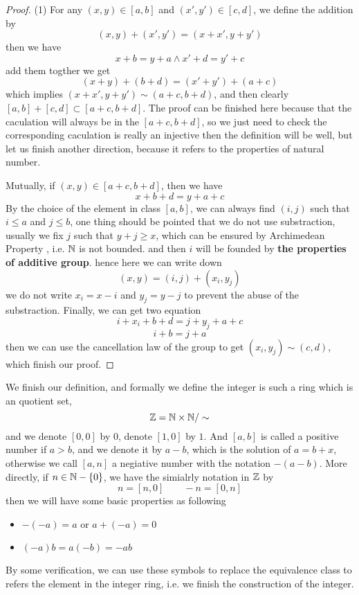 \documentclass[en,geye,blue,pc,12pt]{elegantnote}
\begin{document}
\begin{proof}
  (1) For any \((x,y) \in [a,b]\) and \((x',y') \in [c,d]\), we define the addition by
  \[(x,y)+(x',y') = (x+x',y+y')\]
  then we have 
  \[x+b=y+a \wedge x'+d = y'+c\]
  add them togther we get 
  \[(x+y)+(b+d) = (x'+y')+(a+c)\]
  which implies \((x+x',y+y') \sim (a+c,b+d)\), and then clearly \([a,b]+[c,d] \subset [a+c,b+d]\). The proof can be finished here because that the caculation will always be in the \([a+c,b+d]\), so we just need to check the corresponding caculation is really an injective then the definition will be well, but let us finish another direction, because it refers to the properties of natural number.

  Mutually, if \((x,y)\in [a+c,b+d]\), then we have 
  \[x+b+d = y+a+c\] 
  By the choice of the element in class \([a,b]\), we can always find \((i,j)\) such that \(i\leq a\) and \(j \leq b\), one thing should be pointed that we do not use substraction, usually we fix \(j\) such that \(y+j \geq x\), which can be ensured by Archimedean Property , i.e. \(\mathbb{N}\) is not bounded. and then \(i\) will be founded by \textbf{the properties of additive group}. hence here we can write down \[(x,y) = (i,j) + (x_i,y_j)\]
  we do not write \(x_i =x-i\) and \(y_j = y-j\) to prevent the abuse of the substraction. Finally, we can get two equation
  \[i+x_i+b+d = j+y_j+a+c\]
  \[i+b = j+a\]
  then we can use the cancellation law of the group to get 
  \((x_i,y_j) \sim (c,d)\), which finish our proof.
\end{proof}

\begin{remark}
  We finish our definition, and formally we define the integer is such a ring which is an quotient set,
  \[\mathbb{Z} = \mathbb{N} \times \mathbb{N} / \sim\]
  and we denote \([0,0]\) by \(0\), denote \([1,0]\) by \(1\). And \([a,b]\) is called a positive number if \(a>b\), and we denote it by \(a-b\), which is the solution of \(a=b+x\), otherwise we call \([a,n]\) a negiative number with the notation \(-(a-b)\). More directly, if \(n \in \mathbb{N} - \{0\}\), we have the simialrly notation in \(\mathbb{Z}\) by 
  \[ n = [n,0] \qquad -n = [0,n]\]
  then we will have some basic properties as following
  \begin{itemize}
    \item \(-(-a) = a\) or \(a+(-a)=0\)
    \item \((-a)b = a(-b) = -ab\)
  \end{itemize}
  By some verification, we can use these symbols to replace the equivalence class to refers the element in the integer ring, i.e. we finish the construction of the integer.

\end{remark}
\end{document}
